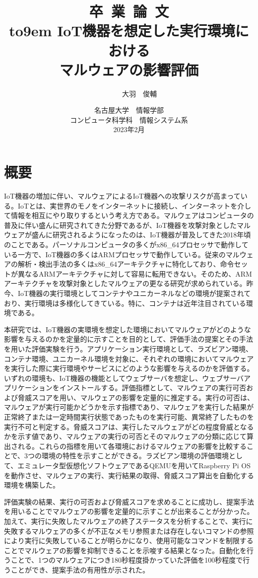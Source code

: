 \documentclass[12pt,a4paper,titlepage,report]{jsbook}
\title{%
\vspace*{-6.0em}\sffamily\huge {\Huge 卒~業~論~文}\\[2.0em]{\vbox to9em{%
IoT機器を想定した実行環境における\\マルウェアの影響評価}}} %
\author{\LARGE\sffamily101910020~~~~~~大羽~~俊輔}%
\date{%
\LARGE\vspace{1.0em}\sffamily 名古屋大学~~情報学部\\コンピュータ科学科~~情報システム系\\%
2023年2月}%
\begin{document}
\newpage
\maketitle
\chapter*{{\normalsize 概要}\vspace*{-3\Cvs}}
IoT機器の増加に伴い、マルウェアによるIoT機器への攻撃リスクが高まっている。IoTとは、実世界のモノをインターネットに接続し、インターネットを介して情報を相互にやり取りするという考え方である。マルウェアはコンピュータの普及に伴い盛んに研究されてきた分野であるが、IoT機器を攻撃対象としたマルウェアが盛んに研究されるようになったのは、IoT機器が普及してきた2018年頃のことである。パーソナルコンピュータの多くがx86\_64プロセッサで動作している一方で、IoT機器の多くはARMプロセッサで動作している。従来のマルウェアの解析・検出手法の多くはx86\_64アーキテクチャに特化しており、命令セットが異なるARMアーキテクチャに対して容易に転用できない。そのため、ARMアーキテクチャを攻撃対象としたマルウェアの更なる研究が求められている。昨今、IoT機器の実行環境としてコンテナやユニカーネルなどの環境が提案されており、実行環境は多様化してきている。特に、コンテナは近年注目されている環境である。

本研究では、IoT機器の実環境を想定した環境においてマルウェアがどのような影響を与えるのかを定量的に示すことを目的として、評価手法の提案とその手法を用いた評価実験を行う。アプリケーション実行環境として、ラズビアン環境、コンテナ環境、ユニカーネル環境を対象に、それぞれの環境においてマルウェアを実行した際に実行環境やサービスにどのような影響を与えるのかを評価する。いずれの環境も、IoT機器の機能としてウェブサーバを想定し、ウェブサーバアプリケーションをインストールする。評価指標として、マルウェアの実行可否および脅威スコアを用い、マルウェアの影響を定量的に推定する。実行の可否は、マルウェアが実行可能かどうかを示す指標であり、マルウェアを実行した結果が正常終了または一定時間実行状態であったものを実行可能、異常終了したものを実行不可と判定する。脅威スコアは、実行したマルウェアがどの程度脅威となるかを示す値であり、マルウェアの実行の可否とそのマルウェアの分類に応じて算出される。これらの指標を用いて各環境におけるマルウェアの影響を比較することで、3つの環境の特性を示すことができる。ラズビアン環境の評価環境として、エミュレータ型仮想化ソフトウェアであるQEMUを用いてRaspberry Pi OSを動作させ、マルウェアの実行、実行結果の取得、脅威スコア算出を自動化する環境を構築した。

評価実験の結果、実行の可否および脅威スコアを求めることに成功し、提案手法を用いることでマルウェアの影響を定量的に示すことが出来ることが分かった。加えて、実行に失敗したマルウェアの終了ステータスを分析することで、実行に失敗するマルウェアの多くが不正なメモリ参照または存在しないコマンドの参照により実行に失敗していることが明らかになり、使用可能なコマンドを制限することでマルウェアの影響を抑制できることを示唆する結果となった。自動化を行うことで、1つのマルウェアにつき180秒程度掛かっていた評価を100秒程度で行うことができ、提案手法の有用性が示された。
\end{document}
